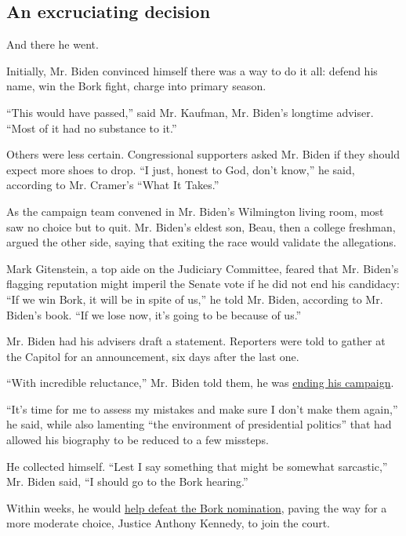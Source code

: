 \hypertarget{an-excruciating-decision}{%
\subsection{An excruciating decision}\label{an-excruciating-decision}}

And there he went.

Initially, Mr. Biden convinced himself there was a way to do it all:
defend his name, win the Bork fight, charge into primary season.

``This would have passed,'' said Mr. Kaufman, Mr. Biden's longtime
adviser. ``Most of it had no substance to it.''

Others were less certain. Congressional supporters asked Mr. Biden if
they should expect more shoes to drop. ``I just, honest to God, don't
know,'' he said, according to Mr. Cramer's ``What It Takes.''

As the campaign team convened in Mr. Biden's Wilmington living room,
most saw no choice but to quit. Mr. Biden's eldest son, Beau, then a
college freshman, argued the other side, saying that exiting the race
would validate the allegations.

Mark Gitenstein, a top aide on the Judiciary Committee, feared that Mr.
Biden's flagging reputation might imperil the Senate vote if he did not
end his candidacy: ``If we win Bork, it will be in spite of us,'' he
told Mr. Biden, according to Mr. Biden's book. ``If we lose now, it's
going to be because of us.''

Mr. Biden had his advisers draft a statement. Reporters were told to
gather at the Capitol for an announcement, six days after the last one.

``With incredible reluctance,'' Mr. Biden told them, he was
\href{https://www.nytimes.com/1987/09/24/us/biden-withdraws-bid-for-president-in-wake-of-furor.html}{ending
his campaign}.

``It's time for me to assess my mistakes and make sure I don't make them
again,'' he said, while also lamenting ``the environment of presidential
politics'' that had allowed his biography to be reduced to a few
missteps.

He collected himself. ``Lest I say something that might be somewhat
sarcastic,'' Mr. Biden said, ``I should go to the Bork hearing.''

Within weeks, he would
\href{https://www.nytimes.com/1987/10/24/politics/borks-nomination-is-rejected-5842-reagan-saddened.html}{help
defeat the Bork nomination}, paving the way for a more moderate choice,
Justice Anthony Kennedy, to join the court.

